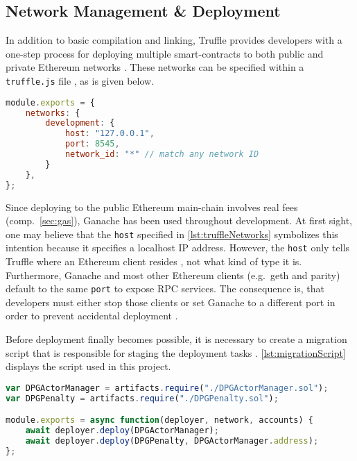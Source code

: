 \subsection{Network Management \& Deployment}
In addition to basic compilation and linking, Truffle provides developers with a one-step process for deploying multiple smart-contracts to both public and private Ethereum networks \cite[Truffle Overview]{truffleSuite}. These networks can be specified within a \texttt{truffle.js} file \cite[Configuration]{truffleSuite}, as is given below. 

\begin{lstlisting}[language=JavaScript, caption=Truffle network management, label=lst:truffleNetworks]
module.exports = {
	networks: {
		development: {
			host: "127.0.0.1",
			port: 8545,
			network_id: "*" // match any network ID
		}
	},
};
\end{lstlisting}

Since deploying to the public Ethereum main-chain involves real fees (comp.~\ref{sec:gas}), Ganache has been used throughout development. At first sight, one may believe that the \texttt{host} specified in \autoref{lst:truffleNetworks} symbolizes this intention because it specifies a localhost IP address. However, the \texttt{host} only tells Truffle where an Ethereum client resides \cite[Configuration]{truffleSuite}, not what kind of type it is. Furthermore, Ganache and most other Ethereum clients (e.g.~geth and parity) default to the same \texttt{port} to expose RPC services. The consequence is, that developers must either stop those clients or set Ganache to a different port in order to prevent accidental deployment \cite[Deploying To The Live Network]{truffleSuite}.

Before deployment finally becomes possible, it is necessary to create a migration script that is responsible for staging the deployment tasks \cite[Running Migrations]{truffleSuite}. \autoref{lst:migrationScript} displays the script used in this project.

\begin{lstlisting}[language=JavaScript, caption=Truffle migration script, label=lst:migrationScript]
var DPGActorManager = artifacts.require("./DPGActorManager.sol");
var DPGPenalty = artifacts.require("./DPGPenalty.sol");

module.exports = async function(deployer, network, accounts) {
	await deployer.deploy(DPGActorManager);
	await deployer.deploy(DPGPenalty, DPGActorManager.address);
};
\end{lstlisting}

